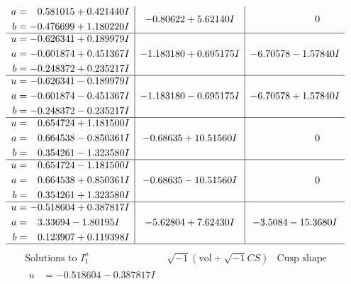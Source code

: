 \documentclass[1p]{elsarticle_modified}
\theoremstyle{definition}
\newcommand{\I}{\sqrt{-1}}
\begin{document}
$$\begin{array}{c|c|c}
\begin{aligned}
a &= \phantom{-}0.581015 + 0.421440 I \\
b &= -0.476699 + 1.180220 I\end{aligned}
 & -0.80622 + 5.62140 I & \phantom{-0.000000 } 0 \\ \hline\begin{aligned}
u &= -0.626341 + 0.189979 I \\
a &= -0.601874 + 0.451367 I \\
b &= -0.248372 + 0.235217 I\end{aligned}
 & -1.183180 + 0.695175 I & -6.70578 - 1.57840 I \\ \hline\begin{aligned}
u &= -0.626341 - 0.189979 I \\
a &= -0.601874 - 0.451367 I \\
b &= -0.248372 - 0.235217 I\end{aligned}
 & -1.183180 - 0.695175 I & -6.70578 + 1.57840 I \\ \hline\begin{aligned}
u &= \phantom{-}0.654724 + 1.181500 I \\
a &= \phantom{-}0.664538 - 0.850361 I \\
b &= \phantom{-}0.354261 - 1.323580 I\end{aligned}
 & -0.68635 + 10.51560 I & \phantom{-0.000000 } 0 \\ \hline\begin{aligned}
u &= \phantom{-}0.654724 - 1.181500 I \\
a &= \phantom{-}0.664538 + 0.850361 I \\
b &= \phantom{-}0.354261 + 1.323580 I\end{aligned}
 & -0.68635 - 10.51560 I & \phantom{-0.000000 } 0 \\ \hline\begin{aligned}
u &= -0.518604 + 0.387817 I \\
a &= \phantom{-}3.33694 - 1.80195 I \\
b &= \phantom{-}0.123907 + 0.119398 I\end{aligned}
 & -5.62804 + 7.62430 I & -3.5084 - 15.3680 I\\
 \hline 
 \end{array}$$\newpage$$\begin{array}{c|c|c}  
\text{Solutions to }I^u_{1}& \I (\text{vol} + \sqrt{-1}CS) & \text{Cusp shape}\\
 \hline 
\begin{aligned}
u &= -0.518604 - 0.387817 I \\

\end{aligned}
\end{array}$$
\end{document}
